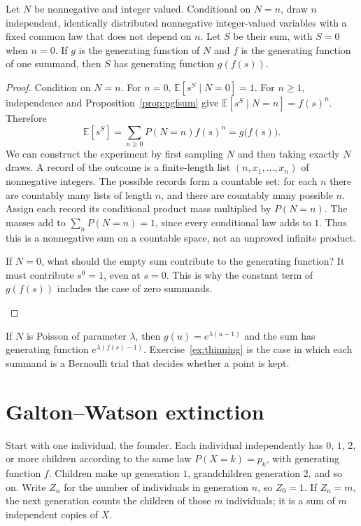 \begin{proposition}\label{prop:randomsum}
Let $N$ be nonnegative and integer valued. Conditional on $N=n$, draw $n$ independent, identically distributed nonnegative integer-valued variables with a fixed common law that does not depend on $n$. Let $S$ be their sum, with $S=0$ when $n=0$. If $g$ is the generating function of $N$ and $f$ is the generating function of one summand, then $S$ has generating function $g(f(s))$.
\end{proposition}
\begin{proof}
Condition on $N=n$. For $n=0$, $\mathbb E[s^S\mid N=0]=1$. For $n\ge1$, independence and Proposition~\ref{prop:pgfsum} give $\mathbb E[s^S\mid N=n]=f(s)^n$. Therefore
\[
 \mathbb E[s^S]=\sum_{n\ge0}P(N=n)f(s)^n=g\bigl(f(s)\bigr).
\]
We can construct the experiment by first sampling $N$ and then taking exactly $N$ draws. A record of the outcome is a finite-length list $(n,x_1,\ldots,x_n)$ of nonnegative integers. The possible records form a countable set: for each $n$ there are countably many lists of length $n$, and there are countably many possible $n$. Assign each record its conditional product mass multiplied by $P(N=n)$. The masses add to $\sum_n P(N=n)=1$, since every conditional law adds to $1$. Thus this is a nonnegative sum on a countable space, not an unproved infinite product.

\begin{think}
If $N=0$, what should the empty sum contribute to the generating function? It must contribute $s^0=1$, even at $s=0$. This is why the constant term of $g(f(s))$ includes the case of zero summands.
\end{think}
\end{proof}

If $N$ is Poisson of parameter $\lambda$, then $g(u)=e^{\lambda(u-1)}$ and the sum has generating function $e^{\lambda(f(s)-1)}$. Exercise~\ref{ex:thinning} is the case in which each summand is a Bernoulli trial that decides whether a point is kept.

\section{Galton--Watson extinction}

Start with one individual, the founder. Each individual independently has $0$, $1$, $2$, or more children according to the same law $P(X=k)=p_k$, with generating function $f$. Children make up generation $1$, grandchildren generation $2$, and so on. Write $Z_n$ for the number of individuals in generation $n$, so $Z_0=1$. If $Z_n=m$, the next generation counts the children of those $m$ individuals; it is a sum of $m$ independent copies of $X$.


